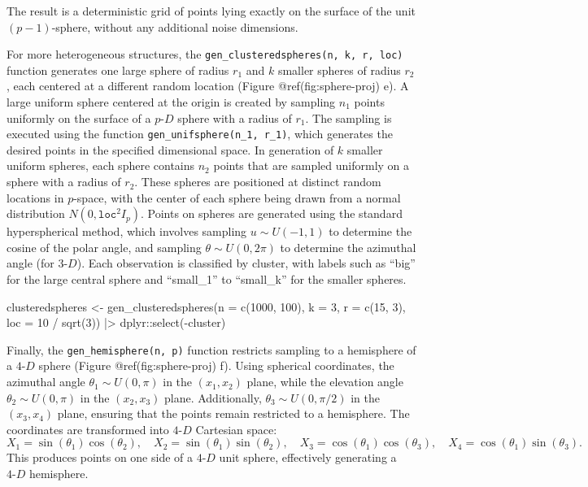 \documentclass[
  11pt,
  a4paper,
]{report}
\newenvironment{Shaded}{\begin{snugshade}}{\end{snugshade}}
\newcommand{\AttributeTok}[1]{\textcolor[rgb]{0.40,0.45,0.13}{#1}}
\newcommand{\DecValTok}[1]{\textcolor[rgb]{0.68,0.00,0.00}{#1}}
\newcommand{\FunctionTok}[1]{\textcolor[rgb]{0.28,0.35,0.67}{#1}}
\newcommand{\NormalTok}[1]{\textcolor[rgb]{0.00,0.23,0.31}{#1}}
\newcommand{\OtherTok}[1]{\textcolor[rgb]{0.00,0.23,0.31}{#1}}
\newcommand{\SpecialCharTok}[1]{\textcolor[rgb]{0.37,0.37,0.37}{#1}}
\begin{document}
The result is a deterministic grid of points lying exactly on the
surface of the unit \((p-1)\)-sphere, without any additional noise
dimensions.

For more heterogeneous structures, the
\texttt{gen\_clusteredspheres(n,\ k,\ r,\ loc)} function generates one
large sphere of radius \(r_1\) and \(k\) smaller spheres of radius
\(r_2\), each centered at a different random location (Figure
@ref(fig:sphere-proj) e). A large uniform sphere centered at the origin
is created by sampling \(n_1\) points uniformly on the surface of a
\(p\text{-}D\) sphere with a radius of \(r_1\). The sampling is executed
using the function \texttt{gen\_unifsphere(n\_1,\ r\_1)}, which
generates the desired points in the specified dimensional space. In
generation of \(k\) smaller uniform spheres, each sphere contains
\(n_2\) points that are sampled uniformly on a sphere with a radius of
\(r_2\). These spheres are positioned at distinct random locations in
\(p\)-space, with the center of each sphere being drawn from a normal
distribution \(N(0, \texttt{loc}^2 I_p)\). Points on spheres are
generated using the standard hyperspherical method, which involves
sampling \(u \sim U(-1, 1)\) to determine the cosine of the polar angle,
and sampling \(\theta \sim U(0, 2\pi)\) to determine the azimuthal angle
(for \(3\text{-}D\)). Each observation is classified by cluster, with
labels such as ``big'' for the large central sphere and ``small\_1'' to
``small\_k'' for the smaller spheres.

\begin{Shaded}
\begin{Highlighting}[]
\NormalTok{clusteredspheres }\OtherTok{\textless{}{-}} \FunctionTok{gen\_clusteredspheres}\NormalTok{(}\AttributeTok{n =} \FunctionTok{c}\NormalTok{(}\DecValTok{1000}\NormalTok{, }\DecValTok{100}\NormalTok{), }\AttributeTok{k =} \DecValTok{3}\NormalTok{, }\AttributeTok{r =} \FunctionTok{c}\NormalTok{(}\DecValTok{15}\NormalTok{, }\DecValTok{3}\NormalTok{),}
                                         \AttributeTok{loc =} \DecValTok{10} \SpecialCharTok{/} \FunctionTok{sqrt}\NormalTok{(}\DecValTok{3}\NormalTok{)) }\SpecialCharTok{|\textgreater{}}
\NormalTok{  dplyr}\SpecialCharTok{::}\FunctionTok{select}\NormalTok{(}\SpecialCharTok{{-}}\NormalTok{cluster)}
\end{Highlighting}
\end{Shaded}

Finally, the \texttt{gen\_hemisphere(n,\ p)} function restricts sampling
to a hemisphere of a \(4\text{-}D\) sphere (Figure @ref(fig:sphere-proj)
f). Using spherical coordinates, the azimuthal angle
\(\theta_1 \sim U(0, \pi)\) in the \((x_1, x_2)\) plane, while the
elevation angle \(\theta_2 \sim U(0, \pi)\) in the \((x_2, x_3)\) plane.
Additionally, \(\theta_3 \sim U(0, \pi/2)\) in the \((x_3, x_4)\) plane,
ensuring that the points remain restricted to a hemisphere. The
coordinates are transformed into \(4\text{-}D\) Cartesian space:
\[X_1 = \sin(\theta_1)\cos(\theta_2), \quad X_2 = \sin(\theta_1)\sin(\theta_2), \quad X_3 = \cos(\theta_1)\cos(\theta_3), \quad X_4 = \cos(\theta_1)\sin(\theta_3).\]
This produces points on one side of a \(4\text{-}D\) unit sphere,
effectively generating a \(4\text{-}D\) hemisphere.
\end{document}
